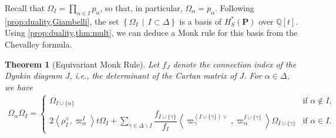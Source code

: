 \documentclass[10pt]{article}
\newtheorem{thm}{Theorem}
\numberwithin{thm}{section}
\theoremstyle{definition}
\theoremstyle{remark}
\newcommand{\Pet}{\ensuremath{\mathbf{P}}}
\newcommand{\IQ}{\mathbb Q}
\newcommand{\set}[2]{\left\{#1\,\middle\vert\,#2\right\}}
\begin{document}
Recall that $\Omega_I=\prod_{\alpha\in I}p_\alpha$,
so that, in particular, $\Omega_\alpha=p_\alpha$.
Following \cref{prop:duality,Giambelli}, the set $\set{\Omega_I}{I\subset\Delta}$ is a basis of $H^*_S(\Pet)$ over $\IQ[t]$. 
Using \cref{prop:duality,thm:mult},
we can deduce a Monk rule for this basis from the Chevalley formula.
\begin{thm}[Equivariant Monk Rule]
\label{thm:monk}
Let $f_J$ denote the \emph{connection index} of the Dynkin diagram $J$,
i.e., the determinant of the Cartan matrix of $J$.
For $\alpha\in\Delta$, we have
\begin{align*}
\Omega_\alpha \Omega_I=
\begin{cases}
\Omega_{I\cup\{\alpha\}}
&\text{if }\alpha\not\in I,\\
2\left\langle\rho^\vee_I,\varpi^I_\alpha\right\rangle t \Omega_I+
\sum\limits_{\gamma\in\Delta\backslash I}
\dfrac{f_{I\cup\{\gamma\}}}{f_I}\left\langle\varpi_\gamma^{(I\cup\{\gamma\})\vee},\varpi^{I\cup\{\gamma\}}_\alpha\right\rangle \Omega_{I\cup\{\gamma\}}
&\text{if }\alpha\in I.
\end{cases}
\end{align*}
\end{thm}
\end{document}
